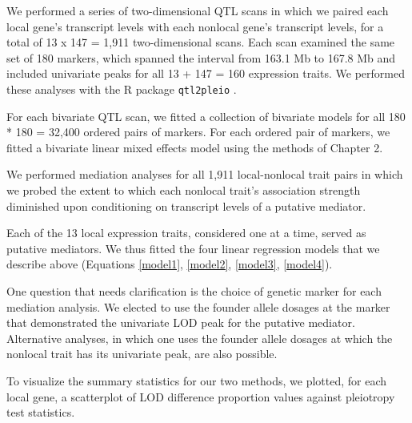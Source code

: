 \documentclass[oneside]{book}\usepackage[]{graphicx}\usepackage[]{color}
\begin{document}
We performed a series of two-dimensional QTL scans in which we paired each local gene's
transcript levels with each nonlocal gene's transcript levels, 
for a total of 13 x 147 = 1,911 two-dimensional scans. 
Each scan examined the same set of 180 markers, which spanned the interval from 163.1 Mb to 167.8 Mb and included univariate peaks for all 13 + 147 = 160 expression traits. 
We performed these analyses with the R package \texttt{qtl2pleio} \citep{qtl2pleio}.

For each bivariate QTL scan, we fitted a collection of bivariate models for 
all 180 * 180 = 32,400 ordered pairs of markers. 
For each ordered pair of markers, we fitted a bivariate linear mixed
effects model using the methods of Chapter 2.


We performed mediation analyses for 
all 1,911 local-nonlocal trait pairs in which
we probed the extent to which each nonlocal trait's association 
strength diminished upon conditioning on transcript levels of a putative mediator.

Each of the 13 local expression traits, considered one at a time, served as putative mediators. 
We thus fitted the four linear regression models that we describe
above (Equations \ref{model1}, \ref{model2}, \ref{model3}, \ref{model4}).

One question that needs clarification is the choice of genetic marker 
for each mediation analysis. 
We elected to use the founder allele dosages at the marker that demonstrated the 
univariate LOD peak for the putative mediator. 
Alternative analyses, in which one uses the founder allele dosages at which the 
nonlocal trait has its univariate peak, are also possible.




To visualize the summary statistics for our two methods, we plotted, 
for each local gene, a scatterplot of LOD difference proportion values 
against pleiotropy test statistics.
\end{document}
